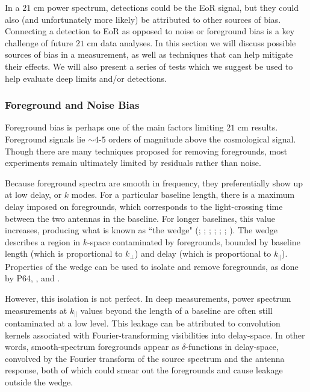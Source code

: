 \documentclass[preprint2,numberedappendix,tighten]{aastex6}  %
\begin{document}
In a $21$ cm power spectrum, detections could be the EoR signal, but they could also (and unfortunately more likely) be attributed to other sources of bias. Connecting a detection to EoR as opposed to noise or foreground bias is a key challenge of future $21$ cm data analyses. In this section we will discuss possible sources of bias in a measurement, as well as techniques that can help mitigate their effects. We will also present a series of tests which we suggest be used to help evaluate deep limits and/or detections.

\subsubsection{Foreground and Noise Bias}
\label{sec:BiasTypes}

Foreground bias is perhaps one of the main factors limiting $21$ cm results. Foreground signals lie $\sim4$-$5$ orders of magnitude above the cosmological signal. Though there are many techniques proposed for removing foregrounds, most experiments remain ultimately limited by residuals rather than noise.

Because foreground spectra are smooth in frequency, they preferentially show up at low delay, or $k$ modes. For a particular baseline length, there is a maximum delay imposed on foregrounds, which corresponds to the light-crossing time between the two antennas in the baseline. For longer baselines, this value increases, producing what is known as ``the wedge" (\citealt{parsons_et_al2012b}; \citealt{liu_et_al2014a}; \citealt{liu_et_al2014b}; \citealt{vedantham_et_al2012}; \citealt{thyagarajan_et_al2013}; \citealt{pober_et_al2013}; \citealt{datta_et_al2010}). The wedge describes a region in $k$-space contaminated by foregrounds, bounded by baseline length (which is proportional to $k_{\perp}$) and delay (which is proportional to $k_{\parallel}$). Properties of the wedge can be used to isolate and remove foregrounds, as done by P64, \citet{parsons_et_al2014}, and \citet{jacobs_et_al2015}.

However, this isolation is not perfect.  In deep measurements, power spectrum measurements at $k_{\parallel}$ values beyond the length of a baseline are often still contaminated at a low level. This leakage can be attributed to convolution kernels associated with Fourier-transforming visibilities into delay-space. In other words, smooth-spectrum foregrounds appear as $\delta$-functions in delay-space, convolved by the Fourier transform of the source spectrum and the antenna response, both of which could smear out the foregrounds and cause leakage outside the wedge.
\end{document}
